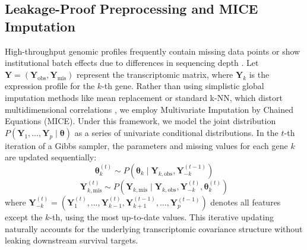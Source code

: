 \documentclass[11pt]{article}
\begin{document}
\subsection{Leakage-Proof Preprocessing and MICE Imputation}
High-throughput genomic profiles frequently contain missing data points or show institutional batch effects due to differences in sequencing depth \citep{troyanskaya2001, leek2010}. Let $\mathbf{Y} = (\mathbf{Y}_{\text{obs}}, \mathbf{Y}_{\text{mis}})$ represent the transcriptomic matrix, where $\mathbf{Y}_k$ is the expression profile for the $k$-th gene. Rather than using simplistic global imputation methods like mean replacement or standard k-NN, which distort multidimensional correlations \citep{troyanskaya2001}, we employ Multivariate Imputation by Chained Equations (MICE). Under this framework, we model the joint distribution $P(\mathbf{Y}_1, \dots, \mathbf{Y}_p \mid \boldsymbol{\theta})$ as a series of univariate conditional distributions. In the $t$-th iteration of a Gibbs sampler, the parameters and missing values for each gene $k$ are updated sequentially:
\begin{equation}
\boldsymbol{\theta}_k^{(t)} \sim P(\boldsymbol{\theta}_k \mid \mathbf{Y}_{k,\text{obs}}, \mathbf{Y}_{-k}^{(t-1)})
\end{equation}
\begin{equation}
\mathbf{Y}_{k,\text{mis}}^{(t)} \sim P(\mathbf{Y}_{k,\text{mis}} \mid \mathbf{Y}_{k,\text{obs}}, \mathbf{Y}_{-k}^{(t)}, \boldsymbol{\theta}_k^{(t)})
\end{equation}
where $\mathbf{Y}_{-k}^{(t)} = \left(\mathbf{Y}_1^{(t)}, \dots, \mathbf{Y}_{k-1}^{(t)}, \mathbf{Y}_{k+1}^{(t-1)}, \dots, \mathbf{Y}_p^{(t-1)}\right)$ denotes all features except the $k$-th, using the most up-to-date values. This iterative updating naturally accounts for the underlying transcriptomic covariance structure without leaking downstream survival targets.
\end{document}

